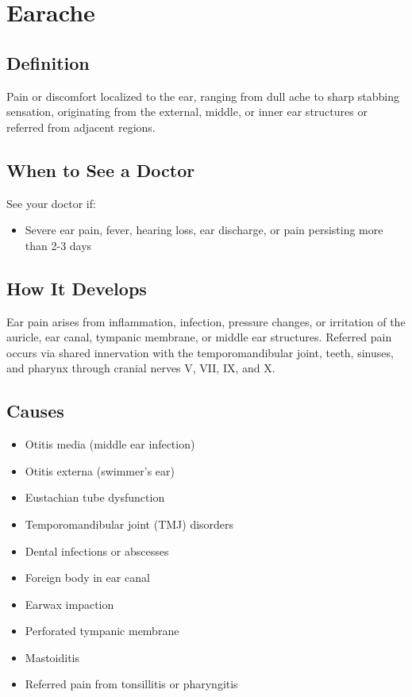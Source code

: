 \chapter{Earache}

\section*{Definition}
Pain or discomfort localized to the ear, ranging from dull ache to sharp stabbing sensation, originating from the external, middle, or inner ear structures or referred from adjacent regions.

\section*{When to See a Doctor}
See your doctor if:
\begin{itemize}
  \item Severe ear pain, fever, hearing loss, ear discharge, or pain persisting more than 2-3 days
\end{itemize}

\section*{How It Develops}
Ear pain arises from inflammation, infection, pressure changes, or irritation of the auricle, ear canal, tympanic membrane, or middle ear structures. Referred pain occurs via shared innervation with the temporomandibular joint, teeth, sinuses, and pharynx through cranial nerves V, VII, IX, and X.

\section*{Causes}
\begin{itemize}
  \item Otitis media (middle ear infection)
  \item Otitis externa (swimmer's ear)
  \item Eustachian tube dysfunction
  \item Temporomandibular joint (TMJ) disorders
  \item Dental infections or abscesses
  \item Foreign body in ear canal
  \item Earwax impaction
  \item Perforated tympanic membrane
  \item Mastoiditis
  \item Referred pain from tonsillitis or pharyngitis
\end{itemize}

